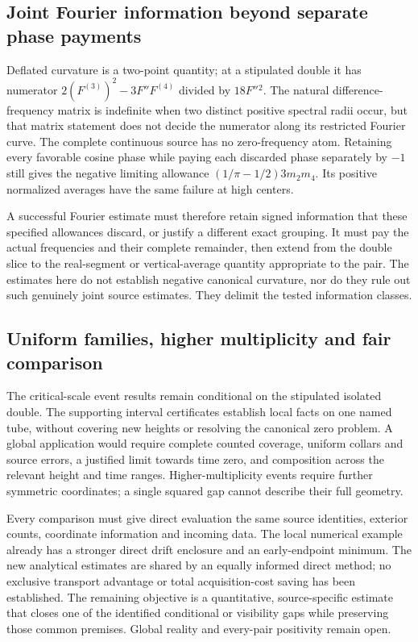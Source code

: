\subsection{Joint Fourier information beyond separate phase payments}

Deflated curvature is a two-point quantity; at a stipulated double it
has numerator \(2(F^{(3)})^2-3F''F^{(4)}\) divided by \(18F''{}^2\).
The natural difference-frequency matrix is indefinite when two distinct
positive spectral radii occur, but that matrix statement does not decide
the numerator along its restricted Fourier curve. The complete continuous
source has no zero-frequency atom. Retaining every favorable cosine phase
while paying each discarded phase separately by \(-1\) still gives the
negative limiting allowance
\((1/\pi-1/2)3m_2m_4\). Its positive normalized averages have the same
failure at high centers.

A successful Fourier estimate must therefore retain signed information
that these specified allowances discard, or justify a different exact
grouping. It must pay the actual frequencies and their complete remainder,
then extend from the double slice to the real-segment or vertical-average
quantity appropriate to the pair. The estimates here do not establish
negative canonical curvature, nor do they rule out such genuinely joint
source estimates. They delimit the tested information classes.

\subsection{Uniform families, higher multiplicity and fair comparison}

The critical-scale event results remain conditional on the stipulated
isolated double. The supporting interval certificates establish local
facts on one named tube, without covering new heights or resolving the
canonical zero problem. A global application would require complete
counted coverage, uniform collars and source errors, a justified limit
towards time zero, and composition across the relevant height and time
ranges. Higher-multiplicity events require further symmetric coordinates;
a single squared gap cannot describe their full geometry.

Every comparison must give direct evaluation the same source identities,
exterior counts, coordinate information and incoming data. The local
numerical example already has a stronger direct drift enclosure and an
early-endpoint minimum. The new analytical estimates are shared by an
equally informed direct method; no exclusive transport advantage or total
acquisition-cost saving has been established. The remaining objective is
a quantitative, source-specific estimate that closes one of the identified
conditional or visibility gaps while preserving those common premises.
Global reality and every-pair positivity remain open.
